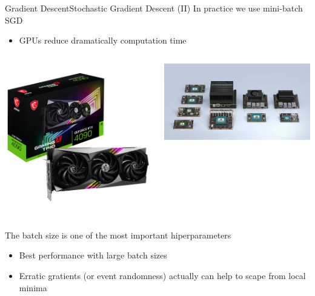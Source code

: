 \documentclass[10pt,compress]{beamer} %
\begin{document}
\begin{frame}{Gradient Descent}{Stochastic Gradient Descent (II)}
    In practice we use mini-batch SGD
    \begin{itemize}
	 \item GPUs reduce dramatically computation time
    \end{itemize}

    \begin{columns}
	\includegraphics[width=\linewidth]{figs/4090.jpg}

	\includegraphics[width=\linewidth]{figs/jetson.jpg}
   \end{columns}

    The batch size is one of the most important hiperparameters 
    \begin{itemize}
	\item Best performance with large batch sizes
	\item Erratic gratients (or event randomness) actually can help to scape from local minima
    \end{itemize}
\end{frame}
\end{document}
